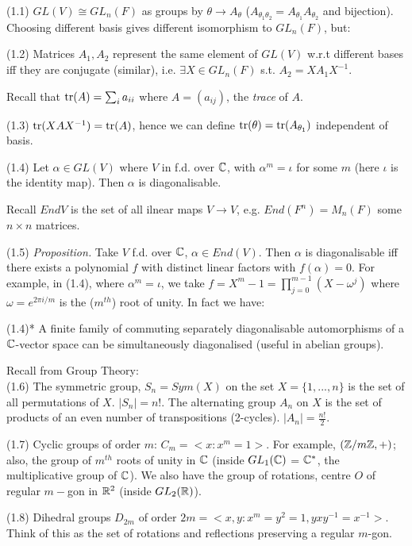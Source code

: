 \documentclass[a4paper]{article}
\begin{document}
(1.1) $GL(V) \cong GL_n(F)$ as groups by $\theta \to A_\theta$ ($A_{\theta_1 \theta_2} = A_{\theta_1} A_{\theta_2}$ and bijection).\\
Choosing different basis gives different isomorphism to $GL_n(F)$, but:

(1.2) Matrices $A_1,A_2$ represent the same element of $GL(V)$ w.r.t different bases iff they are conjugate (similar), i.e. $\exists X \in GL_n(F)$ s.t. $A_2 =XA_1 X^{-1}$.

Recall that $\operatorname{tr}(A) = \sum_i a_{ii}$ where $A = (a_{ij})$, the \emph{trace} of $A$.

(1.3) $\operatorname{tr}(XAX^{-1}) = \operatorname{tr}(A)$, hence we can define $\operatorname{tr}(\theta) = \operatorname{tr}(A_{\theta_1})$ independent of basis.

(1.4) Let $\alpha \in GL(V)$ where $V$ in f.d. over $\mathbb{C}$, with $\alpha^m = \iota$ for some $m$ (here $\iota$ is the identity map). Then $\alpha$ is diagonalisable.

Recall $EndV$ is the set of all ilnear maps $V \to V$, e.g. $End(F^n) =M_n(F)$ some $n \times n$ matrices.

(1.5) \emph{Proposition.} Take $V$ f.d. over $\mathbb{C}$, $\alpha \in End(V)$. Then $\alpha$ is diagonalisable iff there exists a polynomial $f$ with distinct linear factors with $f(\alpha) = 0$. For example, in (1.4), where $\alpha^m = \iota$, we take $f = X^m - 1 = \prod_{j=0}^{m-1} (X-\omega^j)$ where $\omega = e^{2\pi i/m}$ is the ($m^{th}$) root of unity. In fact we have:

(1.4)* A finite family of commuting separately diagonalisable automorphisms of a $\mathbb{C}$-vector space can be simultaneously diagonalised (useful in abelian groups).

Recall from Group Theory:\\
(1.6) The symmetric group, $S_n = Sym(X)$ on the set $X = \{1,...,n\}$ is the set of all permutations of $X$. $|S_n| = n!$. The alternating group $A_n$ on $X$ is the set of products of an even number of transpositions (2-cycles). $|A_n| = \frac{n!}{2}$.

(1.7) Cyclic groups of order $m$: $C_m = <x:x^m = 1>$. For example, $(\mathbb{Z}/m\mathbb{Z}, +)$; also, the group of $m^{th}$ roots of unity in $\mathbb{C}$ (inside $GL_1(\mathbb{C})$ = $\mathbb{C}^*$, the multiplicative group of $\mathbb{C}$). We also have the group of rotations, centre $O$ of regular $m-$gon in $\mathbb{R}^2$ (inside $GL_2(\mathbb{R})$).

(1.8) Dihedral groups $D_{2m}$ of order $2m = <x,y: x^m = y^2 = 1, yxy^{-1} = x^{-1}>$. Think of this as the set of rotations and reflections preserving a regular $m$-gon.
\end{document}
